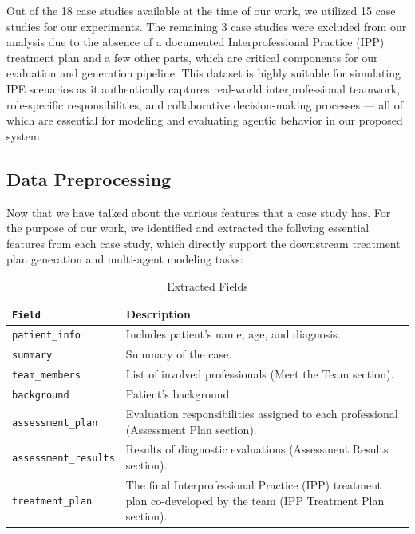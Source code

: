 \documentclass[pdflatex,sn-mathphys-num]{sn-jnl}%
\theoremstyle{thmstyleone}%
\theoremstyle{thmstyletwo}%
\theoremstyle{thmstylethree}%
\begin{document}
Out of the 18 case studies available at the time of our work, we utilized 15 case studies for our experiments. The remaining 3 case studies were excluded from our analysis due to the absence of a documented Interprofessional Practice (IPP) treatment plan and a few other parts, which are critical components for our evaluation and generation pipeline.
This dataset is highly suitable for simulating IPE scenarios as it authentically captures real-world interprofessional teamwork, role-specific responsibilities, and collaborative decision-making processes — all of which are essential for modeling and evaluating agentic behavior in our proposed system.

\subsection{Data Preprocessing}\label{subsec3.2}

Now that we have talked about the various features that a case study has. For the purpose of our work, we identified and extracted the follwing essential features from each case study, which directly support the downstream treatment plan generation and multi-agent modeling tasks:

\begin{table}[h]
\centering
\caption{Extracted Fields}
\renewcommand{\arraystretch}{1.3} %
\begin{tabularx}{\textwidth}{|l|X|}
\toprule
\rowcolor{blue!15}
\texttt{Field}               & \textbf{Description}                                                                                             \\
\midrule
\texttt{patient\_info}       & Includes patient's name, age, and diagnosis.                                                                     \\
\texttt{summary}             & Summary of the case.                                                                                             \\
\texttt{team\_members}       & List of involved professionals (Meet the Team section).                                                          \\
\texttt{background}          & Patient's background.                                                                                            \\
\texttt{assessment\_plan}    & Evaluation responsibilities assigned to each professional (Assessment Plan section).                             \\
\texttt{assessment\_results} & Results of diagnostic evaluations (Assessment Results section).                                                  \\
\texttt{treatment\_plan}     & The final Interprofessional Practice (IPP) treatment plan co-developed by the team (IPP Treatment Plan section). \\
\bottomrule
\end{tabularx}
\label{tab:extracted_fields}
\end{table}
\end{document}
